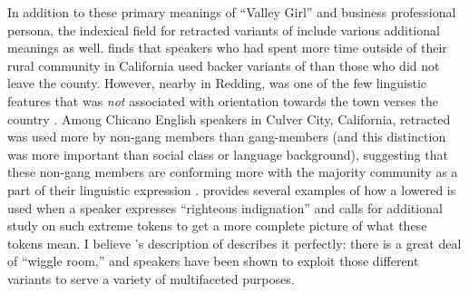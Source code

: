 In addition to these primary meanings of ``Valley Girl'' and business professional persona, the indexical field for retracted variants of \bat include various additional meanings as well. \citet{geenberg_2014_diss} finds that speakers who had spent more time outside of their rural community in California used backer variants of \bat than those who did not leave the county. However, nearby in Redding, \bat was one of the few linguistic features that was \textit{not} associated with orientation towards the town verses the country \citep{podesva_etal_2015}. Among Chicano English speakers in Culver City, California, retracted \bat was used more by non-gang members than gang-members (and this distinction was more important than social class or language background), suggesting that these non-gang members are conforming more with the majority community as a part of their linguistic expression \citep{fought_2003}. \citet[150]{vanhofwegen_2017_diss} provides several examples of how a lowered \bat is used when a speaker expresses ``righteous indignation'' and calls for additional study on such extreme tokens to get a more complete picture of what these tokens mean. I believe \citeauthor{pratt_etal_2018}'s \citeyearpar{pratt_etal_2018} description of \bat describes it perfectly: there is a great deal of ``wiggle room,'' and speakers have been shown to exploit those different variants to serve a variety of multifaceted purposes.

